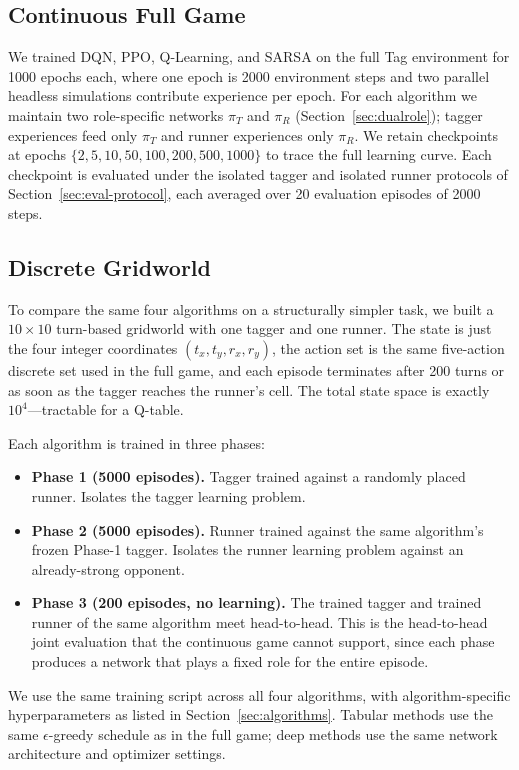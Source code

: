 \documentclass[conference]{IEEEtran}
\begin{document}
\subsection{Continuous Full Game}\label{sec:exp-full}

We trained DQN, PPO, Q-Learning, and SARSA on the full Tag environment
for 1000 epochs each, where one epoch is 2000 environment steps and two
parallel headless simulations contribute experience per epoch. For each
algorithm we maintain two role-specific networks $\pi_T$ and $\pi_R$
(Section~\ref{sec:dualrole}); tagger experiences feed only $\pi_T$ and
runner experiences only $\pi_R$. We retain checkpoints at epochs
$\{2, 5, 10, 50, 100, 200, 500, 1000\}$ to trace the full learning
curve. Each checkpoint is evaluated under the isolated
tagger and isolated runner protocols of Section~\ref{sec:eval-protocol},
each averaged over 20 evaluation episodes of 2000 steps.

\subsection{Discrete Gridworld}\label{sec:exp-grid}

To compare the same four algorithms on a structurally simpler task, we
built a $10{\times}10$ turn-based gridworld with one tagger and one
runner. The state is just the four integer coordinates
$(t_x, t_y, r_x, r_y)$, the action set is the same five-action discrete
set used in the full game, and each episode terminates after 200 turns
or as soon as the tagger reaches the runner's cell. The total state
space is exactly $10^4$---tractable for a Q-table.

Each algorithm is trained in three phases:
\begin{itemize}
    \item \textbf{Phase 1 (5000 episodes).} Tagger trained against a
    randomly placed runner. Isolates the tagger learning problem.
    \item \textbf{Phase 2 (5000 episodes).} Runner trained against the
    same algorithm's frozen Phase-1 tagger. Isolates the runner
    learning problem against an already-strong opponent.
    \item \textbf{Phase 3 (200 episodes, no learning).} The trained
    tagger and trained runner of the same algorithm meet head-to-head.
    This is the head-to-head joint evaluation that the continuous game
    cannot support, since each phase produces a network that plays a
    fixed role for the entire episode.
\end{itemize}
We use the same training script across all four algorithms, with
algorithm-specific hyperparameters as listed in
Section~\ref{sec:algorithms}. Tabular methods use the same
$\epsilon$-greedy schedule as in the full game; deep methods use the
same network architecture and optimizer settings.
\end{document}
